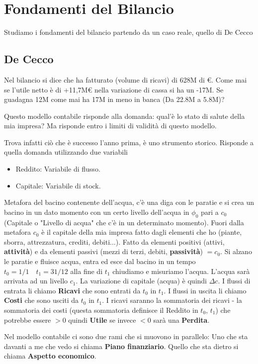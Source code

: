 \documentclass[a4paper,12pt]{article}
\begin{document}
	
	\section{Fondamenti del Bilancio}
	
	Studiamo i fondamenti del bilancio partendo da un caso reale, quello di De Cecco
	
	\subsection{De Cecco} %
	Nel bilancio si dice che ha fatturato (volume di ricavi) di 628M di €. 
	Come mai se l'utile netto è di +11,7M€  nella variazione di cassa si ha un -17M. Se guadagna 12M come mai ha 17M in meno in banca (Da 22.8M a 5.8M)?
	
	Questo modello contabile risponde alla domanda: qual'è lo stato di salute della mia impresa? Ma risponde entro i limiti di validità di questo modello.
	
	Trova infatti ciò che è successo l'anno prima, è uno strumento storico. Risponde a quella domanda utilizzando due variabili
	\begin{itemize}
		\item Reddito: Variabile di flusso. 
		\item Capitale: Variabile di stock. 
	\end{itemize}	
	Metafora del bacino contenente dell'acqua, c'è una diga con le paratie e si crea un bacino in un dato momento con un certo livello dell'acqua in $\phi_0$ pari a $c_0$ (Capitale o "Livello di acqua" che c'è in un determinato momento). Fuori dalla metafora $c_0$ è il capitale della mia impresa fatto dagli elementi che ho (piante, sborra, attrezzatura, crediti, debiti...). 
	Fatto da elementi positivi (attivi, \textbf{attività}) e da elementi passivi (mezzi di terzi, debiti, \textbf{passività}) $= c_0$.
	Si alzano le paratie e fluisce acqua, entra ed esce dal bacino in un tempo $t_0 = 1/1 \quad t_1 = 31/12$ alla fine di $t_1$ chiudiamo e misuriamo l'acqua. L'acqua sarà arrivata ad un livello $c_1$. La variazione di capitale (acqua) è quindi $\varDelta{c}$. I flussi di entrata li chiamo \textbf{Ricavi} che sono entrati da $t_0$ in $t_1$. I flussi in uscita li chiamo \textbf{Costi} che sono usciti da $t_0$ in $t_1$. I ricavi saranno la sommatoria dei ricavi - la sommatoria dei costi (questa sommatoria definisce il Reddito in $t_0$, $t_1$) che potrebbe essere $> 0$ quindi \textbf{Utile} se invece $< 0$ sarà una \textbf{Perdita}.
	
	Nel modello contabile ci sono due rami che si muovono in parallelo:
	Uno che sta davanti a me che vedo si chiama \textbf{Piano finanziario}. Quello che sta dietro si chiama \textbf{Aspetto economico}. 
	
	
	
	
	
\end{document}

